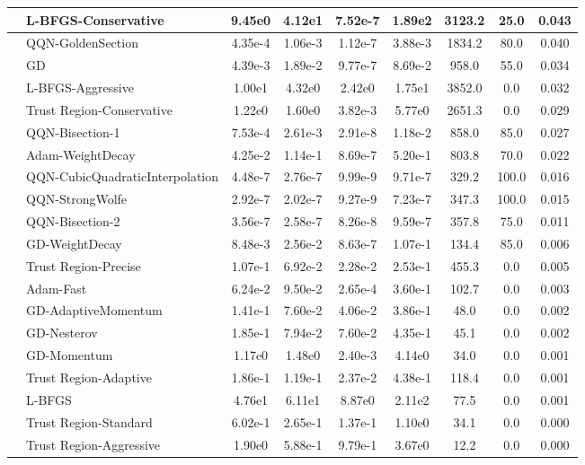 \documentclass[10pt]{article}
\begin{document}
\begin{longtable}{|l|l|c|c|c|c|c|c|c|}
\hline
 & L-BFGS-Conservative & 9.45e0 & 4.12e1 & 7.52e-7 & 1.89e2 & 3123.2 & 25.0 & 0.043 \\
\hline
 & QQN-GoldenSection & 4.35e-4 & 1.06e-3 & 1.12e-7 & 3.88e-3 & 1834.2 & 80.0 & 0.040 \\
\hline
 & GD & 4.39e-3 & 1.89e-2 & 9.77e-7 & 8.69e-2 & 958.0 & 55.0 & 0.034 \\
\hline
 & L-BFGS-Aggressive & 1.00e1 & 4.32e0 & 2.42e0 & 1.75e1 & 3852.0 & 0.0 & 0.032 \\
\hline
 & Trust Region-Conservative & 1.22e0 & 1.60e0 & 3.82e-3 & 5.77e0 & 2651.3 & 0.0 & 0.029 \\
\hline
 & QQN-Bisection-1 & 7.53e-4 & 2.61e-3 & 2.91e-8 & 1.18e-2 & 858.0 & 85.0 & 0.027 \\
\hline
 & Adam-WeightDecay & 4.25e-2 & 1.14e-1 & 8.69e-7 & 5.20e-1 & 803.8 & 70.0 & 0.022 \\
\hline
 & QQN-CubicQuadraticInterpolation & 4.48e-7 & 2.76e-7 & 9.99e-9 & 9.71e-7 & 329.2 & 100.0 & 0.016 \\
\hline
 & QQN-StrongWolfe & 2.92e-7 & 2.02e-7 & 9.27e-9 & 7.23e-7 & 347.3 & 100.0 & 0.015 \\
\hline
 & QQN-Bisection-2 & 3.56e-7 & 2.58e-7 & 8.26e-8 & 9.59e-7 & 357.8 & 75.0 & 0.011 \\
\hline
 & GD-WeightDecay & 8.48e-3 & 2.56e-2 & 8.63e-7 & 1.07e-1 & 134.4 & 85.0 & 0.006 \\
\hline
 & Trust Region-Precise & 1.07e-1 & 6.92e-2 & 2.28e-2 & 2.53e-1 & 455.3 & 0.0 & 0.005 \\
\hline
 & Adam-Fast & 6.24e-2 & 9.50e-2 & 2.65e-4 & 3.60e-1 & 102.7 & 0.0 & 0.003 \\
\hline
 & GD-AdaptiveMomentum & 1.41e-1 & 7.60e-2 & 4.06e-2 & 3.86e-1 & 48.0 & 0.0 & 0.002 \\
\hline
 & GD-Nesterov & 1.85e-1 & 7.94e-2 & 7.60e-2 & 4.35e-1 & 45.1 & 0.0 & 0.002 \\
\hline
 & GD-Momentum & 1.17e0 & 1.48e0 & 2.40e-3 & 4.14e0 & 34.0 & 0.0 & 0.001 \\
\hline
 & Trust Region-Adaptive & 1.86e-1 & 1.19e-1 & 2.37e-2 & 4.38e-1 & 118.4 & 0.0 & 0.001 \\
\hline
 & L-BFGS & 4.76e1 & 6.11e1 & 8.87e0 & 2.11e2 & 77.5 & 0.0 & 0.001 \\
\hline
 & Trust Region-Standard & 6.02e-1 & 2.65e-1 & 1.37e-1 & 1.10e0 & 34.1 & 0.0 & 0.000 \\
\hline
 & Trust Region-Aggressive & 1.90e0 & 5.88e-1 & 9.79e-1 & 3.67e0 & 12.2 & 0.0 & 0.000 \\

\end{longtable}
\end{document}
